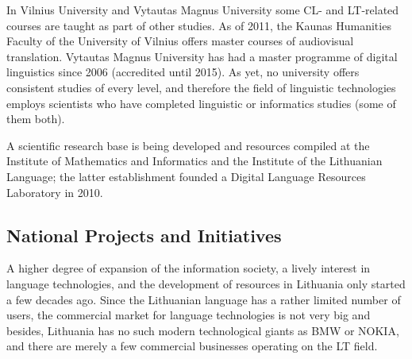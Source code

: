 \begin{multicols}{2}
In Vilnius University and Vytautas Magnus University some CL- and LT-related courses are taught as part of other studies. As of 2011, the Kaunas Humanities Faculty of the University of Vilnius offers master courses of audiovisual translation. Vytautas Magnus University has had a master programme of digital linguistics  since 2006 (accredited until 2015). As yet, no university offers consistent studies of every level, and therefore the field of linguistic technologies employs scientists who have completed linguistic or informatics studies (some of them both). 

A scientific research base is being developed and resources compiled at the Institute of Mathematics and Informatics and the Institute of the Lithuanian Language; the latter establishment founded a Digital Language Resources Laboratory in 2010.

\subsection{National Projects and Initiatives}

A higher degree of expansion of the information society, a lively interest in language technologies, and the development of resources in Lithuania only started a few decades ago. Since the Lithuanian language has a rather limited number of users, the commercial market for language technologies is not very big and besides, Lithuania has no such modern technological giants as BMW or NOKIA, and there are merely a few commercial businesses operating on the LT field.  


\end{multicols}
